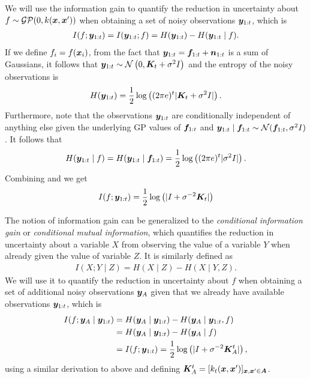We will use the information gain to quantify the reduction in uncertainty
about $f \sim \mathcal{GP}(0, k(\bm{x}, \bm{x}'))$ when obtaining a set of
noisy observations $\bm{y}_{1:t}$, which is
\begin{align*}
I(f; \bm{y}_{1:t}) = I(\bm{y}_{1:t}; f) = H(\bm{y}_{1:t}) - H(\bm{y}_{1:t}\mid f).
\end{align*}
If we define $f_i = f(\bm{x}_i)$, from the fact that
$\bm{y}_{1:t} = \bm{f}_{1:t} + \bm{n}_{1:t}$ is a sum of Gaussians, it follows that
$\bm{y}_{1:t} \sim \mathcal{N}\left(0, \bm{K}_t + \sigma^2 I\right)$ and the
entropy of the noisy observations is
\begin{align}\label{eq:hy}
H(\bm{y}_{1:t}) = \frac{1}{2}\log\left((2\pi e)^t |\bm{K}_t + \sigma^2 I|\right).
\end{align}
Furthermore, note that the observations $\bm{y}_{1:t}$ are conditionally
independent of anything else given the underlying GP values
of $\bm{f}_{1:t}$ and
$\bm{y}_{1:t}\mid \bm{f}_{1:t} \sim \mathcal{N}(\bm{f}_{1:t}, \sigma^2 I)$.
It follows that
\begin{align}\label{eq:hyf}
H(\bm{y}_{1:t}\mid f) = H(\bm{y}_{1:t}\mid \bm{f}_{1:t}) = \frac{1}{2}\log\left((2\pi e)^t |\sigma^2 I|\right).
\end{align}
Combining  and  we get
\begin{align*}
I(f; \bm{y}_{1:t}) = \frac{1}{2}\log\left(|I + \sigma^{-2} \bm{K}_t|\right)
\end{align*} 

The notion of information gain can be generalized to the \emph{conditional
information gain} or \emph{conditional mutual information}, which quantifies
the reduction in uncertainty about a variable $X$ from observing the value
of a variable $Y$ when already given the value of variable $Z$. It is
similarly defined as
\begin{align*}
I(X; Y\mid Z) = H(X\mid Z) - H(X\mid Y, Z).
\end{align*} We will use it to quantify the reduction in uncertainty about $f$ when
obtaining a set of additional noisy observations $\bm{y}_A$ given that
we already have available observations $\bm{y}_{1:t}$, which is
\begin{align*}
I(f; \bm{y}_A\mid \bm{y}_{1:t}) &= H(\bm{y}_A\mid \bm{y}_{1:t}) - H(\bm{y}_A\mid \bm{y}_{1:t}, f)\\
                          &= H(\bm{y}_A\mid \bm{y}_{1:t}) - H(\bm{y}_A\mid f)\\
                          &= I(f; \bm{y}_{1:t}) = \frac{1}{2}\log\left(|I + \sigma^{-2} \bm{K}^t_A|\right),
\end{align*}
using a similar derivation to above and defining
${\bm{K}^t_A = [k_t(\bm{x}, \bm{x}')]_{\bm{x}, \bm{x}'\in\bm{A}}}$.
